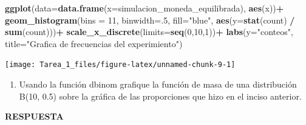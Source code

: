 \documentclass[11pt,]{article}
\newenvironment{Shaded}{\begin{snugshade}}{\end{snugshade}}
\newcommand{\DataTypeTok}[1]{\textcolor[rgb]{0.13,0.29,0.53}{#1}}
\newcommand{\DecValTok}[1]{\textcolor[rgb]{0.00,0.00,0.81}{#1}}
\newcommand{\KeywordTok}[1]{\textcolor[rgb]{0.13,0.29,0.53}{\textbf{#1}}}
\newcommand{\NormalTok}[1]{#1}
\newcommand{\OperatorTok}[1]{\textcolor[rgb]{0.81,0.36,0.00}{\textbf{#1}}}
\newcommand{\StringTok}[1]{\textcolor[rgb]{0.31,0.60,0.02}{#1}}
\providecommand{\tightlist}{%
  \setlength{\itemsep}{0pt}\setlength{\parskip}{0pt}}
\newcommand{\res}{\textbf{RESPUESTA}\\}
\begin{document}
\begin{Shaded}
\begin{Highlighting}[]
\KeywordTok{ggplot}\NormalTok{(}\DataTypeTok{data=}\KeywordTok{data.frame}\NormalTok{(}\DataTypeTok{x=}\NormalTok{simulacion_moneda_equilibrada), }\KeywordTok{aes}\NormalTok{(x))}\OperatorTok{+}
\StringTok{  }\KeywordTok{geom_histogram}\NormalTok{(}\DataTypeTok{bins =} \DecValTok{11}\NormalTok{, }\DataTypeTok{binwidth=}\NormalTok{.}\DecValTok{5}\NormalTok{, }\DataTypeTok{fill=}\StringTok{"blue"}\NormalTok{, }\KeywordTok{aes}\NormalTok{(}\DataTypeTok{y=}\KeywordTok{stat}\NormalTok{(count) }\OperatorTok{/}\StringTok{ }\KeywordTok{sum}\NormalTok{(count)))}\OperatorTok{+}
\StringTok{  }\KeywordTok{scale_x_discrete}\NormalTok{(}\DataTypeTok{limits=}\KeywordTok{seq}\NormalTok{(}\DecValTok{0}\NormalTok{,}\DecValTok{10}\NormalTok{,}\DecValTok{1}\NormalTok{))}\OperatorTok{+}
\StringTok{  }\KeywordTok{labs}\NormalTok{(}\DataTypeTok{y=}\StringTok{"conteos"}\NormalTok{, }\DataTypeTok{title=}\StringTok{"Grafica de frecuencias del experimiento"}\NormalTok{)}
\end{Highlighting}
\end{Shaded}

\begin{center}\texttt{[image: Tarea\_1\_files/figure-latex/unnamed-chunk-9-1]} \end{center}

\begin{enumerate}
\def\labelenumi{\alph{enumi}.}
\setcounter{enumi}{1}
\tightlist
\item
  Usando la función dbinom grafique la función de masa de una
  distribución B(10, 0.5) sobre la gráfica de las proporciones que hizo
  en el inciso anterior.
\end{enumerate}

\res
\end{document}
